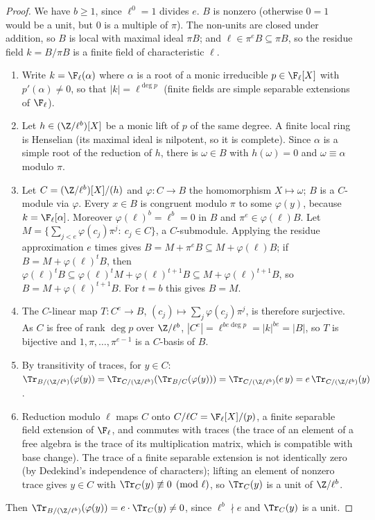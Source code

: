 \begin{proof}
We have $b\ge1$, since $\ell^0=1$ divides $e$. $B$ is nonzero (otherwise $0=1$ would be a unit, but $0$ is a
multiple of $\pi$). The non-units are closed under addition, so $B$ is local with maximal ideal $\pi B$; and
$\ell\in\pi^eB\subseteq\pi B$, so the residue field $k=B/\pi B$ is a finite field of characteristic $\ell$.
\begin{enumerate}[label=(\alph*)]
\item Write $k=\F_\ell(\alpha)$ where $\alpha$ is a root of a monic irreducible $p\in\F_\ell[X]$ with $p'(\alpha)\ne0$, so
  that $|k|=\ell^{\deg p}$ (finite fields are simple separable extensions of $\F_\ell$).
\item Let $h\in(\Z/\ell^b)[X]$ be a monic lift of $p$ of the same degree. A finite local ring is Henselian
  (its maximal ideal is nilpotent, so it is complete). Since $\alpha$
  is a simple root of the reduction of $h$, there is $\omega\in B$ with $h(\omega)=0$ and $\omega\equiv\alpha$ modulo
  $\pi$.
\item Let $C=(\Z/\ell^b)[X]/(h)$ and $\varphi:C\to B$ the homomorphism $X\mapsto\omega$; $B$ is a $C$-module via $\varphi$.
  Every $x\in B$ is congruent modulo $\pi$ to some $\varphi(y)$, because $k=\F_\ell[\alpha]$. Moreover
  $\varphi(\ell)^b=\ell^b=0$ in $B$ and $\pi^e\in\varphi(\ell)B$. Let $M=\{\sum_{j<e}\varphi(c_j)\pi^j:\ c_j\in C\}$, a
  $C$-submodule. Applying the residue approximation $e$ times gives $B=M+\pi^eB\subseteq M+\varphi(\ell)B$; if
  $B=M+\varphi(\ell)^tB$, then $\varphi(\ell)^tB\subseteq\varphi(\ell)^tM+\varphi(\ell)^{t+1}B\subseteq M+\varphi(\ell)^{t+1}B$, so
  $B=M+\varphi(\ell)^{t+1}B$. For $t=b$ this gives $B=M$.
\item The $C$-linear map $T:C^e\to B$, $(c_j)\mapsto\sum_j\varphi(c_j)\pi^j$, is therefore surjective. As $C$ is free of
  rank $\deg p$ over $\Z/\ell^b$, $|C^e|=\ell^{be\deg p}=|k|^{be}=|B|$, so $T$ is bijective and $1,\pi,\dots,\pi^{e-1}$ is a
  $C$-basis of $B$.
\item By transitivity of traces, for $y\in C$:
  $\Tr_{B/(\Z/\ell^b)}(\varphi(y))=\Tr_{C/(\Z/\ell^b)}(\Tr_{B/C}(\varphi(y)))=\Tr_{C/(\Z/\ell^b)}(e\,y)=e\,\Tr_{C/(\Z/\ell^b)}(y)$.
\item Reduction modulo $\ell$ maps $C$ onto $C/\ell C=\F_\ell[X]/(p)$, a finite separable field extension of $\F_\ell$,
  and commutes with traces (the trace of an element of a free algebra is the trace of its multiplication
  matrix, which is compatible with base change). The trace of a finite separable extension is not
  identically zero (by Dedekind's independence of characters); lifting an element of nonzero
  trace gives $y\in C$ with $\Tr_C(y)\not\equiv0\pmod\ell$, so $\Tr_C(y)$ is a unit of $\Z/\ell^b$.
\end{enumerate}
Then $\Tr_{B/(\Z/\ell^b)}(\varphi(y))=e\cdot\Tr_C(y)\ne0$, since $\ell^b\nmid e$ and $\Tr_C(y)$ is a unit.
\end{proof}

